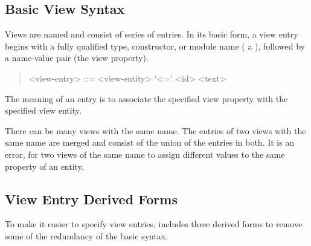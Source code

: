 \subsection{Basic View Syntax}
Views are named and consist of series of entries.
In its basic form, a view entry begins with a fully qualified type, constructor, or module name (
a ), followed by a name-value pair (the view property).
%
\begin{quote}\begin{grammar}
  <view-entry>  ::= <view-entity> `<=' <id> <text>
\end{grammar}\end{quote}%
%
The meaning of an entry is to associate the specified view property with the specified view entity.
%

There can be many views with the same name.
The entries of two views with the same name are merged and consist of the
union of the entries in both.
It is an error, for two views of the same name to assign different values
to the same property of an entity.

\subsection{View Entry Derived Forms}
To make it easier to specify view entries, \asdl{} includes three derived forms
to remove some of the redundancy of the basic syntax.

